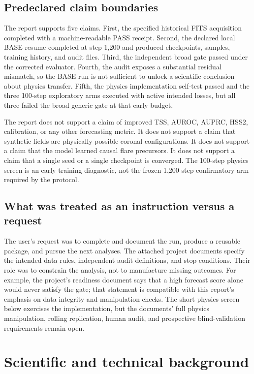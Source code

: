 \documentclass[11pt,oneside]{report}
\begin{document}
\section{Predeclared claim boundaries}

The report supports five claims. First, the specified historical FITS acquisition completed with a machine-readable PASS receipt. Second, the declared local BASE resume completed at step 1,200 and produced checkpoints, samples, training history, and audit files. Third, the independent broad gate passed under the corrected evaluator. Fourth, the audit exposes a substantial residual mismatch, so the BASE run is not sufficient to unlock a scientific conclusion about physics transfer. Fifth, the physics implementation self-test passed and the three 100-step exploratory arms executed with active intended losses, but all three failed the broad generic gate at that early budget.

The report does not support a claim of improved TSS, AUROC, AUPRC, HSS2, calibration, or any other forecasting metric. It does not support a claim that synthetic fields are physically possible coronal configurations. It does not support a claim that the model learned causal flare precursors. It does not support a claim that a single seed or a single checkpoint is converged. The 100-step physics screen is an early training diagnostic, not the frozen 1,200-step confirmatory arm required by the protocol.

\section{What was treated as an instruction versus a request}

The user’s request was to complete and document the run, produce a reusable package, and pursue the next analyses. The attached project documents specify the intended data rules, independent audit definitions, and stop conditions. Their role was to constrain the analysis, not to manufacture missing outcomes. For example, the project’s readiness document says that a high forecast score alone would never satisfy the gate; that statement is compatible with this report’s emphasis on data integrity and manipulation checks. The short physics screen below exercises the implementation, but the documents’ full physics manipulation, rolling replication, human audit, and prospective blind-validation requirements remain open.

\chapter{Scientific and technical background}
\end{document}
